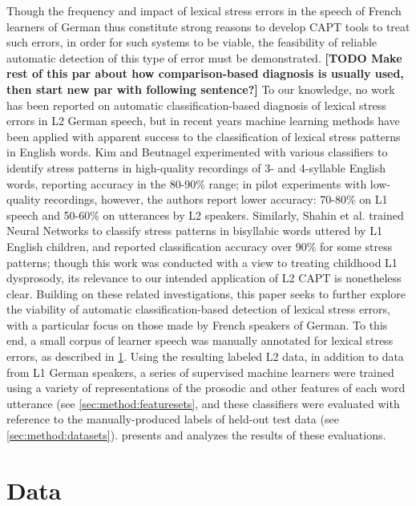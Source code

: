 \documentclass[a4paper]{article}
\newcommand{\TODO}[1]{{\color{red}\textbf{[TODO #1]}}}
\begin{document}
	Though the frequency and impact of lexical stress errors in the speech of French learners of German thus constitute strong reasons to develop CAPT tools to treat such errors, in order for such systems to be viable, the feasibility of reliable automatic detection of this type of error must be demonstrated. 
	\TODO{Make rest of this par about how comparison-based diagnosis is usually used, then start new par with following sentence?}
	To our knowledge, no work has been reported on automatic classification-based diagnosis of lexical stress errors in L2 German speech, 
	but in recent years machine learning methods have been applied with apparent success to the classification of lexical stress patterns in English words. 
	Kim and Beutnagel \cite{Kim2011} experimented with various classifiers to identify stress patterns in high-quality recordings of 3- and 4-syllable English words, reporting accuracy in the 80-90\% range; in pilot experiments with low-quality recordings, however, the authors report lower accuracy: 70-80\% on L1 speech and 50-60\% on utterances by L2 speakers. 
	Similarly, Shahin et al. \cite{Shahin2012} trained Neural Networks to classify stress patterns in bisyllabic words uttered by L1 English children, 
	and reported classification accuracy over 90\% for some stress patterns; though this work was conducted with a view to treating childhood L1 dysprosody, its relevance to our intended application of L2 CAPT is nonetheless clear.
	Building on these related investigations, this paper seeks to further explore the viability of automatic classification-based detection of lexical stress errors, with a particular focus on those made by French speakers of German.
	To this end, a small corpus of learner speech was manually annotated for lexical stress errors, as described in \cref{sec:data}.
	Using the resulting labeled L2 data, in addition to data from L1 German speakers, a series of supervised machine learners were trained using a variety of representations of the prosodic and other features of each word utterance (see \cref{sec:method:featuresets}, and these classifiers were evaluated with reference to the manually-produced labels of held-out test data (see \cref{sec:method:datasets}).  presents and analyzes the results of these evaluations.
	
	
	\section{Data}
	\label{sec:data}
	
\end{document}
